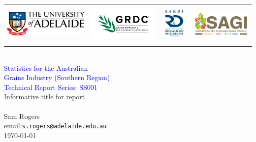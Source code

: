 \documentclass[oneside,12pt]{book}
\begin{document}

\thispagestyle{empty}
\vspace*{30mm}
\begin{flushright}
\HRule\\[5mm]


\begin{tabular}{rrrr}
\includegraphics[height = 1.5cm]{UoA}  &
\includegraphics[height = 2.0cm]{GRDC} &
\includegraphics[height = 2.0cm]{SARDI} &
\includegraphics[height = 1.5cm]{SAGI-STH}
\end{tabular}\\[5mm]

\huge
\textcolor{blue}{\sbf Statistics for the Australian\\
Grains Industry (Southern Region)\\ Technical Report Series: SS001}\\[6mm]

{\sbf Informative title for report}\\
\Large
\vspace{2mm}{\sbf Report for UA000001}\\[5mm]

\sf\normalsize
Sam Rogers\\
email:\;\href{mailto:s.rogers@adelaide.edu.au}{\nolinkurl{s.rogers@adelaide.edu.au}}\\[8mm]

\today\\
\HRule
\end{flushright}
\end{document}
